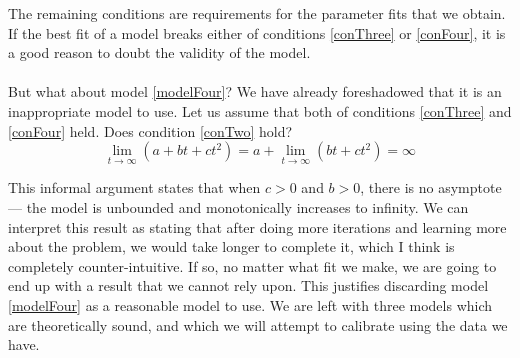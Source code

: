 The remaining conditions are requirements for the parameter fits that we obtain.
If the best fit of a model breaks either of conditions \ref{conThree} or
\ref{conFour}, it is a good reason to doubt the validity of the model.\\
\\
But what about model \ref{modelFour}?
We have already foreshadowed that it is an inappropriate model to use.
Let us assume that both of conditions \ref{conThree} and \ref{conFour} held.
Does condition \ref{conTwo} hold?
\begin{equation}
  \lim_{t \to \infty} (a + bt + ct^2) = a + \lim_{t \to \infty} (bt+ct^2) =
  \infty
\end{equation}

This informal argument states that when $c > 0$ and $b > 0$, there is no
asymptote --- the model is unbounded and monotonically increases to infinity.
We can interpret this result as stating that after doing more iterations and
learning more about the problem, we would take longer to complete it, which I
think is completely counter-intuitive.
If so, no matter what fit we make, we are going to end up with a result that we
cannot rely upon.
This justifies discarding model \ref{modelFour} as a reasonable model to use.
We are left with three models which are theoretically sound, and which we will
attempt to calibrate using the data we have.
